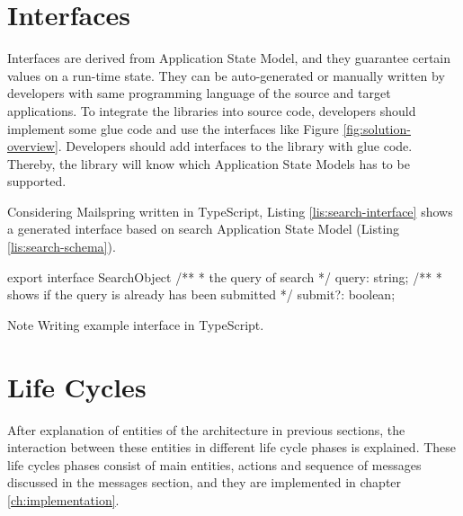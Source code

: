 \section{Interfaces}
Interfaces are derived from Application State Model, and they guarantee certain values on a run-time state. They can be auto-generated or manually written by developers with same programming language of the source and target applications.
To integrate the libraries into source code, developers should implement some glue code and use the interfaces like Figure \ref{fig:solution-overview}. Developers should add interfaces to the library with glue code. Thereby, the library will know which Application State Models has to be supported.

Considering Mailspring written in TypeScript, Listing \ref{lis:search-interface} shows a generated interface based on search Application State Model (Listing \ref{lis:search-schema}).

\FloatBarrier
\begin{code}
\begin{js}
export interface SearchObject {
    /**
     * the query of search
     */
    query: string;
    /**
     * shows if the query is already has been submitted
     */
    submit?: boolean;
}
\end{js}
\caption{Note Writing example interface in TypeScript.}
\label{lis:search-interface}
\end{code}
\FloatBarrier


\section{Life Cycles}
After explanation of entities of the architecture in previous sections, the interaction between these entities in different life cycle phases is explained. These life cycles phases consist of main entities, actions and sequence of messages discussed in the messages section, and they are implemented in chapter \ref{ch:implementation}. 

